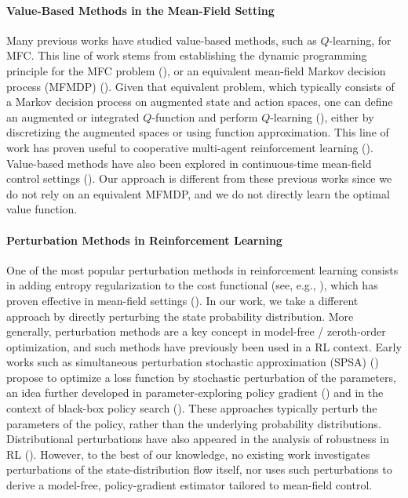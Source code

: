 \documentclass[11pt]{article}
\numberwithin{equation}{section}
\theoremstyle{definition}
\theoremstyle{remark}
\newcommand{\citet}{\cite}
\begin{document}
\paragraph{Value-Based Methods in the Mean-Field Setting}
Many previous works have studied value-based methods, such as $Q$-learning, for MFC. This line of work stems from establishing the dynamic programming principle for the MFC problem (\citet{lauriere2016dynamic, pham2017dynamic, gu2023dynamic}), or an equivalent mean-field Markov decision process (MFMDP) (\citet{motte2022mean,bauerle2023mean, carmona2023model}). Given that equivalent problem, which typically consists of a Markov decision process on augmented state and action spaces, one can define an augmented or integrated $Q$-function and perform $Q$-learning (\citet{angiuli2022unified, gu2023dynamic, carmona2023model}), either by discretizing the augmented spaces or using function approximation. This line of work has proven useful to cooperative multi-agent reinforcement learning (\citet{gu2021mean, gu2025mean}). Value-based methods have also been explored in continuous-time mean-field control settings (\citet{wei2025continuous}).
Our approach is different from these previous works since we do not rely on an equivalent MFMDP, and we do not directly learn the optimal value function.

\paragraph{Perturbation Methods in Reinforcement Learning}
One of the most popular perturbation methods in reinforcement learning consists in adding entropy regularization to the cost functional (see, e.g., \citet{ziebart2008maximum,fox2016tamingnoisereinforcementlearning,schulman2017proximalpolicyoptimizationalgorithms,haarnoja2018sac,geist19atheory}), which has proven effective in mean-field settings (\citet{cui2021approximately, guo2022entropy, anahtarci2023q}).
In our work, we take a different approach by directly perturbing the state probability distribution. More generally, perturbation methods are a key concept in model-free / zeroth-order optimization, and such methods have previously been used in a RL context.
Early works such as simultaneous perturbation stochastic approximation (SPSA) (\citet{spall1992multivariate}) propose to optimize a loss function by stochastic perturbation of the parameters, an idea further developed in parameter-exploring policy gradient (\citet{sehnke2010parameter}) and in the context of black-box policy search (\citet{salimans2017evolution}). These approaches typically perturb the parameters of the policy, rather than the underlying probability distributions.
Distributional perturbations have also appeared in the analysis of robustness in RL (\citet{liu2022distributionally, wang2024samplecomplexityvariancereduceddistributionally}). However, to the best of our knowledge, no existing work investigates perturbations of the state-distribution flow itself, nor uses such perturbations to derive a model-free, policy-gradient estimator tailored to mean-field control.
\end{document}
